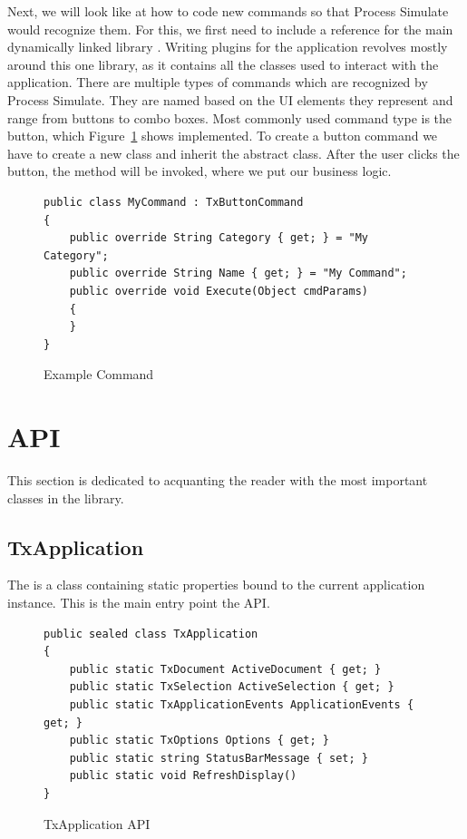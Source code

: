 Next, we will look like at how to code new commands so that Process Simulate would recognize them. 
For this, we first need to include a reference for the main dynamically linked library . 
Writing plugins for the application revolves mostly around this one library, as it contains all the classes used to interact with the application. 
There are multiple types of commands which are recognized by Process Simulate.
They are named based on the UI elements they represent and range from buttons to combo boxes. 
Most commonly used command type is the button, which Figure~\ref{fig:CodeCommand} shows implemented.
To create a button command we have to create a new class and inherit the  abstract class.
After the user clicks the button, the  method will be invoked, where we put our business logic. \\

\begin{figure}[H]
    \caption{Example Command}
    \centering
    \begin{verbatim}
public class MyCommand : TxButtonCommand
{
    public override String Category { get; } = "My Category";
    public override String Name { get; } = "My Command";
    public override void Execute(Object cmdParams)
    {
    }
}
    \end{verbatim}
    \label{fig:CodeCommand}
\end{figure}

\section{API}

This section is dedicated to acquanting the reader with the most important classes in the  library. 

\subsection{TxApplication}

The  is a class containing static properties bound to the current application instance.
This is the main entry point the API.

\begin{figure}[H]
    \caption{TxApplication API}
    \centering
    \begin{verbatim}
public sealed class TxApplication
{
    public static TxDocument ActiveDocument { get; }
    public static TxSelection ActiveSelection { get; }
    public static TxApplicationEvents ApplicationEvents { get; }
    public static TxOptions Options { get; }
    public static string StatusBarMessage { set; }
    public static void RefreshDisplay()
}
    \end{verbatim}
    \label{fig:CodeTxApplication}
\end{figure}

